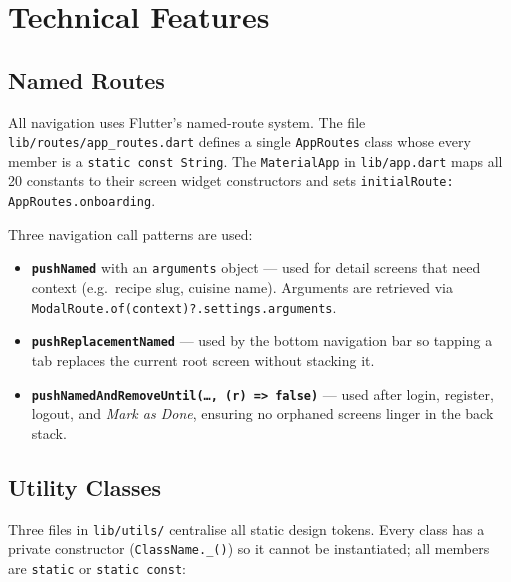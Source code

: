 \documentclass[11pt,a4paper]{article}
\begin{document}
\newpage
\section{Technical Features}

\subsection{Named Routes}

All navigation uses Flutter's named-route system. The file \texttt{lib/routes/app\_routes.dart} defines a single \texttt{AppRoutes} class whose every member is a \texttt{static const String}. The \texttt{MaterialApp} in \texttt{lib/app.dart} maps all 20 constants to their screen widget constructors and sets \texttt{initialRoute: AppRoutes.onboarding}.

Three navigation call patterns are used:
\begin{itemize}
  \item \textbf{\texttt{pushNamed}} with an \texttt{arguments} object — used for detail screens that need context (e.g.\ recipe slug, cuisine name). Arguments are retrieved via \texttt{ModalRoute.of(context)?.settings.arguments}.
  \item \textbf{\texttt{pushReplacementNamed}} — used by the bottom navigation bar so tapping a tab replaces the current root screen without stacking it.
  \item \textbf{\texttt{pushNamedAndRemoveUntil(\ldots, (r) => false)}} — used after login, register, logout, and \emph{Mark as Done}, ensuring no orphaned screens linger in the back stack.
\end{itemize}

\subsection{Utility Classes}

Three files in \texttt{lib/utils/} centralise all static design tokens. Every class has a private constructor (\texttt{ClassName.\_()}) so it cannot be instantiated; all members are \texttt{static} or \texttt{static const}:
\end{document}
